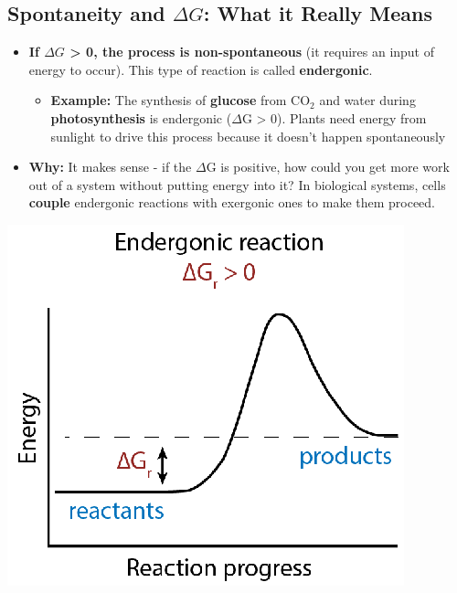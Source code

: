 \documentclass[10pt]{article}
\begin{document}
\subsection*{Spontaneity and $\Delta G$: What it Really Means}
\begin{itemize}
    \item \textbf{If $\Delta G$ > 0, the process is non-spontaneous} (it requires an input of energy to occur).  This type of reaction is called \textbf{endergonic}.
    \begin{itemize}
        \item \textbf{Example:} The synthesis of \textbf{glucose} from CO$_2$ and water during \textbf{photosynthesis} is endergonic ($\Delta$G > 0).  Plants need energy from sunlight to drive this process because it doesn't happen spontaneously
    \end{itemize}
    \item \textbf{Why:} It makes sense - if the $\Delta$G is positive, how could you get more work out of a system without putting energy into it?  In biological systems, cells \textbf{couple} endergonic reactions with exergonic ones to make them proceed.
\end{itemize}
\begin{center}
    \includegraphics*[scale=0.9]{L3_9.png}
\end{center}
\end{document}

